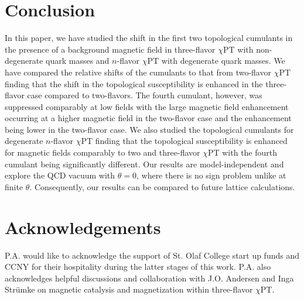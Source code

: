 \documentclass[12pt]{elsarticle}
\begin{document}
\section{Conclusion}
\label{sec:conclusion}
In this paper, we have studied the shift in the first two topological cumulants in the presence of a background magnetic field in three-flavor $\chi$PT with non-degenerate quark masses and $n$-flavor $\chi$PT with degenerate quark masses. We have compared the relative shifts of the cumulants to that from two-flavor $\chi$PT finding that the shift in the topological susceptibility is enhanced in the three-flavor case compared to two-flavors. The fourth cumulant, however, was suppressed comparably at low fields with the large magnetic field enhancement occurring at a higher magnetic field in the two-flavor case and the enhancement being lower in the two-flavor case. We also studied the topological cumulants for degenerate $n$-flavor $\chi$PT finding that the topological susceptibility is enhanced for magnetic fields comparably to two and three-flavor $\chi$PT with the fourth cumulant being significantly different. Our results are model-independent and explore the QCD vacuum with $\theta=0$, where there is no sign problem unlike at finite $\theta$. Consequently, our results can be compared to future lattice calculations.

\section*{Acknowledgements} 
\noindent 
P.A. would like to acknowledge the support of St. Olaf College start up funds and CCNY for their hospitality during the latter stages of this work. P.A. also acknowledges helpful discussions and collaboration with J.O. Andersen and Inga Str\"{u}mke on magnetic catalysis and magnetization within three-flavor $\chi$PT.

\appendix
\end{document}
